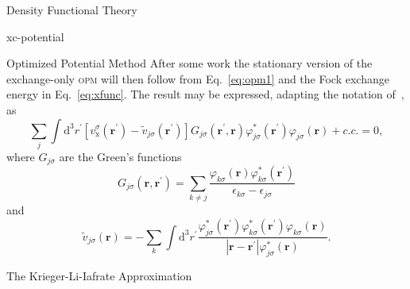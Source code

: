 \documentclass[letterpaper, 11 pt]{report}
\begin{document}
\begin{chapter}{Density Functional Theory \label{chap:dft}}
\begin{section}{xc-potential \label{sec:xcpot}}
\begin{subsection}{Optimized Potential Method \label{sec:opm}}
         After some work the stationary version of the exchange-only \textsc{opm} will then follow from
         Eq.~\eqref{eq:opm1} and the Fock exchange energy in Eq.~\eqref{eq:xfunc}. The result may be
         expressed, adapting the notation of~\cite{klieq}, as
         \begin{equation} \label{eq:opmEq}
            \sum\limits_j \int \mathrm{d}^3 r^\prime
            \left[ v^\sigma_\mathrm{x}(\mathbf{r}^\prime)
                 - \tilde{v}_{j \sigma} (\mathbf{r}^\prime) \right]
                 G_{j \sigma}(\mathbf{r}^\prime, \mathbf{r}) \varphi^*_{j \sigma} (\mathbf{r}^\prime)
                 \varphi_{j \sigma} (\mathbf{r}) + c.c. = 0,
         \end{equation}
         where $G_{j \sigma}$ are the Green's functions
         \begin{equation}
            G_{j \sigma}(\mathbf{r}, \mathbf{r}^\prime) = \sum\limits_{k \neq j}
            \frac{\varphi_{k \sigma} (\mathbf{r}) \varphi^*_{k \sigma} (\mathbf{r}^\prime)}
            {\epsilon_{k \sigma} - \epsilon_{j \sigma}}
         \end{equation}
         and
         \begin{equation} \label{eq:tildev}
            \tilde{v}_{j \sigma} (\mathbf{r}) =  - \sum\limits_k \int \mathrm{d}^3 r^\prime
               \frac{ \varphi^*_{j \sigma} (\mathbf{r}^\prime) \varphi^*_{k \sigma} (\mathbf{r}^\prime)
                      \varphi_{k \sigma} (\mathbf{r}) }
                      {\left| \mathbf{r} - \mathbf{r}^\prime \right| \varphi^*_{j \sigma} (\mathbf{r})}.
         \end{equation}

      \end{subsection}

      \begin{subsection}{The Krieger-Li-Iafrate Approximation \label{sec:kli}}


\end{subsection}
\end{section}
\end{chapter}
\end{document}

